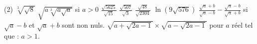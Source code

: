 %
%
	\begin{tasks}(2)
		\task $\sqrt[3]{\sqrt{8}}$
		\task $\sqrt{a\sqrt[3]{a\sqrt{a}}}$ si $a>0$
		\task $\frac{\sqrt{5625}}{\sqrt{15}}$
		\task $\frac{\sqrt{507}}{\sqrt{3}}$
		\task $\frac{\sqrt{48}}{\sqrt{2304}}$
		\task $\ln(9\sqrt{576})$
		\task $\frac{\sqrt{a}+b}{\sqrt{a}-b}-\frac{\sqrt{a}-b}{\sqrt{a}+b}$ si $\sqrt{a}-b$  et $\sqrt{a}+b$ sont non nuls.
		\task $\sqrt{a +\sqrt{2a - 1}} \times \sqrt{a -\sqrt{2a -1}}$ pour $a$ réel tel que : $a>1$.
	\end{tasks}
